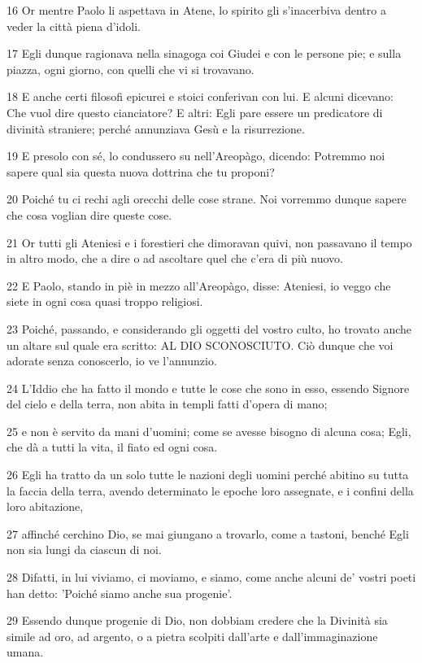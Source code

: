 \par 16 Or mentre Paolo li aspettava in Atene, lo spirito gli s'inacerbiva dentro a veder la città piena d'idoli.
\par 17 Egli dunque ragionava nella sinagoga coi Giudei e con le persone pie; e sulla piazza, ogni giorno, con quelli che vi si trovavano.
\par 18 E anche certi filosofi epicurei e stoici conferivan con lui. E alcuni dicevano: Che vuol dire questo cianciatore? E altri: Egli pare essere un predicatore di divinità straniere; perché annunziava Gesù e la risurrezione.
\par 19 E presolo con sé, lo condussero su nell'Areopàgo, dicendo: Potremmo noi sapere qual sia questa nuova dottrina che tu proponi?
\par 20 Poiché tu ci rechi agli orecchi delle cose strane. Noi vorremmo dunque sapere che cosa voglian dire queste cose.
\par 21 Or tutti gli Ateniesi e i forestieri che dimoravan quivi, non passavano il tempo in altro modo, che a dire o ad ascoltare quel che c'era di più nuovo.
\par 22 E Paolo, stando in piè in mezzo all'Areopàgo, disse: Ateniesi, io veggo che siete in ogni cosa quasi troppo religiosi.
\par 23 Poiché, passando, e considerando gli oggetti del vostro culto, ho trovato anche un altare sul quale era scritto: AL DIO SCONOSCIUTO. Ciò dunque che voi adorate senza conoscerlo, io ve l'annunzio.
\par 24 L'Iddio che ha fatto il mondo e tutte le cose che sono in esso, essendo Signore del cielo e della terra, non abita in templi fatti d'opera di mano;
\par 25 e non è servito da mani d'uomini; come se avesse bisogno di alcuna cosa; Egli, che dà a tutti la vita, il fiato ed ogni cosa.
\par 26 Egli ha tratto da un solo tutte le nazioni degli uomini perché abitino su tutta la faccia della terra, avendo determinato le epoche loro assegnate, e i confini della loro abitazione,
\par 27 affinché cerchino Dio, se mai giungano a trovarlo, come a tastoni, benché Egli non sia lungi da ciascun di noi.
\par 28 Difatti, in lui viviamo, ci moviamo, e siamo, come anche alcuni de' vostri poeti han detto: 'Poiché siamo anche sua progenie'.
\par 29 Essendo dunque progenie di Dio, non dobbiam credere che la Divinità sia simile ad oro, ad argento, o a pietra scolpiti dall'arte e dall'immaginazione umana.

